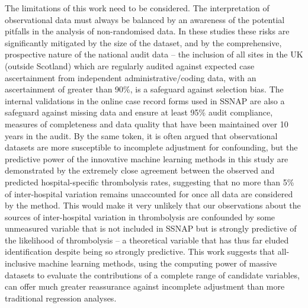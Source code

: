 The limitations of this work need to be considered. The interpretation of observational data must always be balanced by an awareness of the potential pitfalls in the analysis of non-randomised data. In these studies these risks are significantly mitigated by the size of the dataset, and by the comprehensive, prospective nature of the national audit data – the inclusion of all sites in the UK (outside Scotland) which are regularly audited against expected case ascertainment from independent administrative/coding data, with an ascertainment of greater than 90\%, is a safeguard against selection bias. The internal validations in the online case record forms used in SSNAP are also a safeguard against missing data and ensure at least 95\% audit compliance, measures of completeness and data quality that have been maintained over 10 years in the audit. By the same token, it is often argued that observational datasets are more susceptible to incomplete adjustment for confounding, but the predictive power of the innovative machine learning methods in this study are demonstrated by the extremely close agreement between the observed and predicted hospital-specific thrombolysis rates, suggesting that no more than 5\% of inter-hospital variation remains unaccounted for once all data are considered by the method. This would make it very unlikely that our observations about the sources of inter-hospital variation in thrombolysis are confounded by some unmeasured variable that is not included in SSNAP but is strongly predictive of the likelihood of thrombolysis – a theoretical variable that has thus far eluded identification despite being so strongly predictive. This work suggests that all-inclusive machine learning methods, using the computing power of massive datasets to evaluate the contributions of a complete range of candidate variables, can offer much greater reassurance against incomplete adjustment than more traditional regression analyses.

